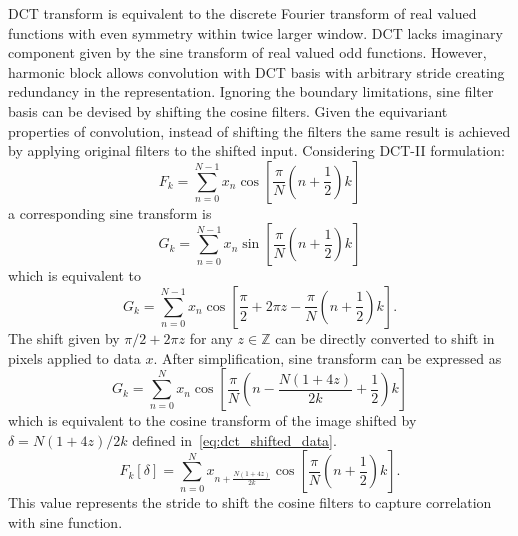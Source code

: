 \documentclass[conference]{IEEEtran}
\begin{document}
DCT transform is equivalent to the discrete Fourier transform of real valued functions with even symmetry within twice larger window. DCT lacks imaginary component given by the sine transform of real valued odd functions. However, harmonic block allows convolution with DCT basis with arbitrary stride creating redundancy in the representation. Ignoring the boundary limitations, sine filter basis can be devised by shifting the cosine filters. Given the equivariant properties of convolution, instead of shifting the filters the same result is achieved by applying original filters to the shifted input. Considering DCT-II formulation:
\begin{equation} \label{eq:dct}
F_{k} = \sum_{n=0}^{N-1} x_n \cos{\left[\frac{\pi}{N} \left(n+\frac{1}{2}\right)k\right]}
\end{equation}
a corresponding sine transform is
\begin{equation} \label{eq:dst}
G_{k} = \sum_{n=0}^{N-1} x_n \sin{\left[\frac{\pi}{N} \left(n+\frac{1}{2}\right)k\right]}
\end{equation}
which is equivalent to
\begin{equation} \label{eq:dst_to_dct}
G_{k} = \sum_{n=0}^{N-1} x_n \cos{\left[\frac{\pi}{2}+2\pi z-\frac{\pi}{N} \left(n+\frac{1}{2}\right)k\right]}.
\end{equation}
The shift given by $\pi/2 + 2\pi z$ for any $z \in \mathbb{Z}$ can be directly converted to shift in pixels applied to data $x$. After simplification, sine transform can be expressed as \begin{equation} \label{eq:dct_shifted}
G_{k} = \sum_{n=0}^N{x_n \cos{\left[ \frac{\pi}{N} \left( n-\frac{N(1+4z)}{2k}+\frac{1}{2} \right) k \right]}}
\end{equation}
which is equivalent to the cosine transform of the image shifted by $\delta=N\left(1+4z\right)/2k$ defined in~\eqref{eq:dct_shifted_data}. 
\begin{equation} \label{eq:dct_shifted_data}
F_k[\delta]=\sum_{n=0}^N{x_{n+\frac{N(1+4z)}{2k}} \cos{\left[ \frac{\pi}{N} \left( n+\frac{1}{2} \right) k \right]}}.
\end{equation}
This value represents the stride to shift the cosine filters to capture correlation with sine function.
\end{document}
